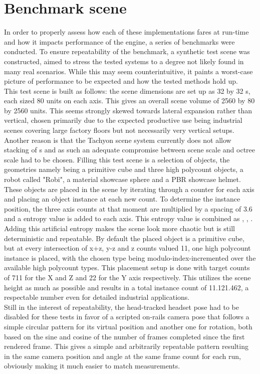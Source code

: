 \section{Benchmark scene}
In order to properly assess how each of these implementations fares at run-time and how it impacts performance of the engine, a series of benchmarks were conducted. To ensure repeatability of the benchmark, a synthetic test scene was constructed, aimed to stress the tested systems to a degree not likely found in many real scenarios. While this may seem counterintuitive, it paints a worst-case picture of performance to be expected and how the tested methods hold up. \\
This test scene is built as follows: the scene dimensions are set up as 32 by 32 s, each  sized 80 units on each axis. This gives an overall scene volume of 2560 by 80 by 2560 units. This seems strongly skewed towards lateral expansion rather than vertical, chosen primarily due to the expected productive use being industrial scenes covering large factory floors but not necessarily very vertical setups. Another reason is that the Tachyon scene  system currently does not allow stacking of s and as such an adequate compromise between scene scale and octree scale had to be chosen. 
Filling this test scene is a selection of objects, the geometries namely being a primitive cube and three high polycount objects, a robot called "Robi", a material showcase sphere and a PBR showcase helmet. These objects are placed in the scene by iterating through a counter for each axis and placing an object instance at each new count. To determine the instance position, the three axis counts at that moment are multiplied by a spacing of 3.6 and a entropy value is added to each axis. This entropy value is combined as , , . Adding this artificial entropy makes the scene look more chaotic but is still deterministic and repeatable.
By default the placed object is a primitive cube, but at every intersection of x+z, y-z and z counts valued 11, one high polycount instance is placed, with the chosen type being modulo-index-incremented over the available high polycount types. 
This placement setup is done with target counts of 711 for the X and Z and 22 for the Y axis respectively. This utilizes the scene height as much as possible and results in a total instance count of 11.121.462, a respectable number even for detailed industrial applications. \\
Still in the interest of repeatability, the head-tracked headset pose had to be disabled for these tests in favor of a scripted on-rails camera pose that follows a simple circular pattern for its virtual position and another one for rotation, both based on the sine and cosine of the number of frames completed since the first rendered frame. This gives a simple and arbitrarily repeatable pattern resulting in the same camera position and angle at the same frame count for each run, obviously making it much easier to match measurements. 

